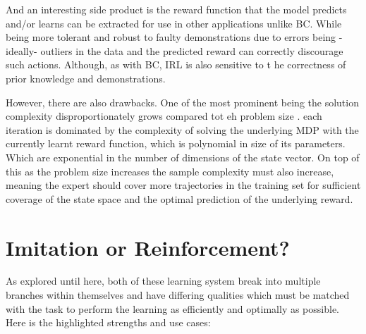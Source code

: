 And an interesting side product is the reward function that the model predicts and/or learns can be extracted for use in other applications unlike BC. While being more tolerant and robust to faulty demonstrations due to errors being -ideally- outliers in the data and the predicted reward can correctly discourage such actions. Although, as with BC, IRL is also sensitive to t he correctness of prior knowledge and demonstrations.


However, there are also drawbacks. One of the most prominent being the solution complexity disproportionately grows compared tot eh problem size \cite{ARORA2021103500}. each iteration is dominated by the complexity of solving the underlying MDP with the currently learnt reward function, which is polynomial in size of its parameters. Which are exponential in the number of dimensions of the state vector. On top of this as the problem size increases the sample complexity must also increase, meaning the expert should cover more trajectories in the training set for sufficient coverage of the state space and the optimal prediction of the underlying reward.




\section{Imitation or Reinforcement?}
As explored until here, both of these learning system break into multiple branches within themselves and have differing qualities which must be matched with the task to perform the learning as efficiently and optimally as possible. Here is the highlighted strengths and use cases:

